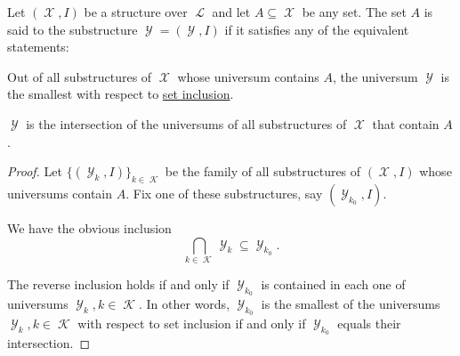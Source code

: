 \begin{definition}\label{def:first_order_generated_substructure}
  Let \( (\mscrX, I) \) be a structure over \( \mscrL \) and let \( A \subseteq \mscrX \) be any set. The set \( A \) is said to  the substructure \( \mscrY = (\mscrY, I) \) if it satisfies any of the equivalent statements:
  \begin{thmenum}
     Out of all substructures of \( \mscrX \) whose universum contains \( A \), the universum \( \mscrY \) is the smallest with respect to \hyperref[def:subset]{set inclusion}.

     \( \mscrY \) is the intersection of the universums of all substructures of \( \mscrX \) that contain \( A \).
  \end{thmenum}
\end{definition}
\begin{proof}
  Let \( \{ (\mscrY_k, I) \}_{k \in \mscrK} \) be the family of all substructures of \( (\mscrX, I) \) whose universums contain \( A \). Fix one of these substructures, say \( (\mscrY_{k_0}, I) \).

  We have the obvious inclusion
  \begin{equation*}
    \bigcap_{k \in \mscrK} \mscrY_k \subseteq \mscrY_{k_0}.
  \end{equation*}

  The reverse inclusion holds if and only if \( \mscrY_{k_0} \) is contained in each one of universums \( \mscrY_k, k \in \mscrK \). In other words, \( \mscrY_{k_0} \) is the smallest of the universums \( \mscrY_k, k \in \mscrK \) with respect to set inclusion if and only if \( \mscrY_{k_0} \) equals their intersection.
\end{proof}

